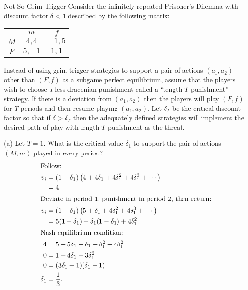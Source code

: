 \documentclass[8pt]{extarticle}
\begin{document}
  \begin{problem}{Not-So-Grim Trigger}
    Consider the infinitely repeated Prisoner's Dilemma with discount factor $\delta < 1$ described by the following matrix:
    \begin{center}
      \begin{tabular}{c|c|c|}
        \multicolumn{1}{c}{} & \multicolumn{1}{c}{$m$} & \multicolumn{1}{c}{$f$}\\
        \cline{2-3}
        $M$ & $4,4$ & $-1,5$ \\
        \cline{2-3}
        $F$ & $5,-1$ & $1,1$\\
        \cline{2-3}
      \end{tabular}
    \end{center}
    Instead of using grim-trigger strategies to support a pair of actions $(a_1,a_2)$ other than $(F,f)$ as a subgame perfect equilibrium, assume that the players wish to choose a less draconian punishment called a ``length-$T$ punishment'' strategy. If there is a deviation from $(a_1,a_2)$ then the players will play $(F,f)$ for $T$ periods and then resume playing $(a_1,a_2)$. Let $\delta_T$ be the critical discount factor so that if $\delta > \delta_T$ then the adequately defined strategies will implement the desired path of play with length-$T$ punishment as the threat.
    \tcblower
    \begin{problem}{(a)}
      Let $T = 1$. What is the critical value $\delta_1$ to support the pair of actions $(M,m)$ played in every period?
      \tcblower
      \begin{align*}
        \shortintertext{Follow:}
        v_i &= (1-\delta_1)\left(4 + 4\delta_1 + 4\delta_1^2 + 4\delta_1^3 + \cdots\right)\\
            &= 4\\
        \shortintertext{Deviate in period 1, punishment in period 2, then return:}
        v_i &= (1-\delta_1)\left(5 + \delta_1 + 4\delta_1^2 + 4\delta_1^3 + \cdots\right) \\
            &= 5(1-\delta_1) + \delta_1 (1-\delta_1) + 4\delta_1^2\\
        \shortintertext{Nash equilibrium condition:}
        4 &= 5-5\delta_1 + \delta_1 - \delta_1^2 + 4\delta_1^2\\
        0 &= 1 - 4\delta_1 + 3\delta_1^2\\
        0 &= (3\delta_1 - 1)(\delta_1 - 1)\\
        \delta_1 &= \frac{1}{3}.\\
      \end{align*}

\end{problem}
\end{problem}
\end{document}
